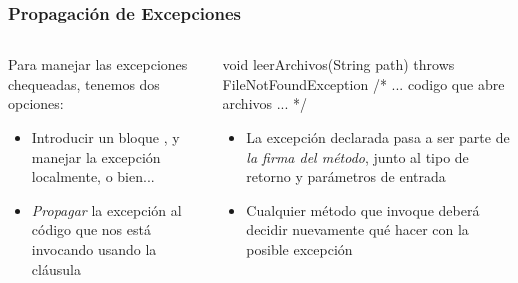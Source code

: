 \documentclass{beamer}
\begin{document}
\begin{frame}[fragile]
  \frametitle{Propagación de Excepciones}

  \begin{columns}
    \begin{column}{0.4\textwidth}
     \begin{small}
       Para manejar las excepciones chequeadas, tenemos dos opciones:
  \begin{itemize}

  \item Introducir un bloque , y manejar la excepción
    localmente, o bien...
    
  \item \emph{Propagar} la excepción al código que nos está
    invocando usando la cláusula 
  \end{itemize}
      \end{small}      
    \end{column}
    \begin{column}{0.6\textwidth}
\begin{jsmall}
  void leerArchivos(String path)
       throws FileNotFoundException {
    /* ... codigo que abre archivos ... */
  }
\end{jsmall}
      \begin{small}
      \begin{itemize}

      \item La excepción declarada pasa a ser parte de \emph{la firma
          del método}, junto al tipo de retorno y parámetros de
        entrada
      
      \item Cualquier método que invoque  deberá
        decidir nuevamente qué hacer con la posible excepción

      \end{itemize}
      \end{small}
      
    \end{column}
  \end{columns}  
\end{frame}




\end{document}

